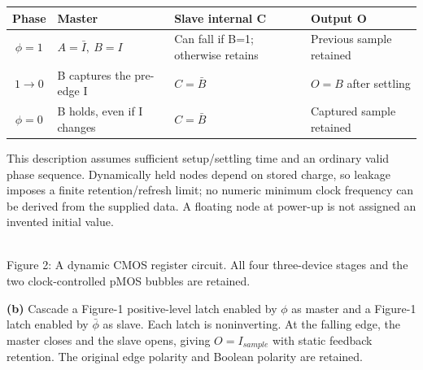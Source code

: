 \documentclass[10pt]{article}
\newcommand{\mos}[4]{\begin{scope}[shift={(#1,#2)}]
\draw(0,.24)--(0,-.24);\draw(0,.2)--(.25,.2)--(.25,.5);\draw(0,-.2)--(.25,-.2)--(.25,-.5);
\draw(-.16,.23)--(-.16,-.23);
\ifnum#4=1\draw(-.26,0)circle(.06);\draw(-.75,0)--(-.32,0);\else\draw(-.75,0)--(-.16,0);\fi
\node[anchor=east,font=\scriptsize]at(-.76,0){$#3$};\end{scope}}
\newcommand{\gnd}[2]{\draw(#1,#2)--(#1,{#2-.12});\draw({#1-.17},{#2-.12})--({#1+.17},{#2-.12});\draw({#1-.11},{#2-.2})--({#1+.11},{#2-.2});}
\newcommand{\rail}[3]{\draw(#1,#2)--(#1,{#2+.14});\node[above,font=\scriptsize]at(#1,{#2+.14}){$#3$};}
\begin{document}
\begin{center}\begin{tabular}{c|lll}\toprule
Phase&Master&Slave internal C&Output O\\\midrule
$\phi=1$&$A=\bar I,\ B=I$&Can fall if B=1; otherwise retains&Previous sample retained\\
$1\to0$&B captures the pre-edge I&$C=\bar B$&$O=B$ after settling\\
$\phi=0$&B holds, even if I changes&$C=\bar B$&Captured sample retained\\\bottomrule
\end{tabular}\end{center}
This description assumes sufficient setup/settling time and an ordinary valid phase sequence. Dynamically held nodes depend on stored charge, so leakage imposes a finite retention/refresh limit; no numeric minimum clock frequency can be derived from the supplied data. A floating node at power-up is not assigned an invented initial value.
\begin{center}\\Figure 2: A dynamic CMOS register circuit. All four three-device stages and the two clock-controlled pMOS bubbles are retained.\end{center}
\textbf{(b)} Cascade a Figure-1 positive-level latch enabled by $\phi$ as master and a Figure-1 latch enabled by $\bar\phi$ as slave. Each latch is noninverting. At the falling edge, the master closes and the slave opens, giving $O=I_{sample}$ with static feedback retention. The original edge polarity and Boolean polarity are retained.
\end{document}
